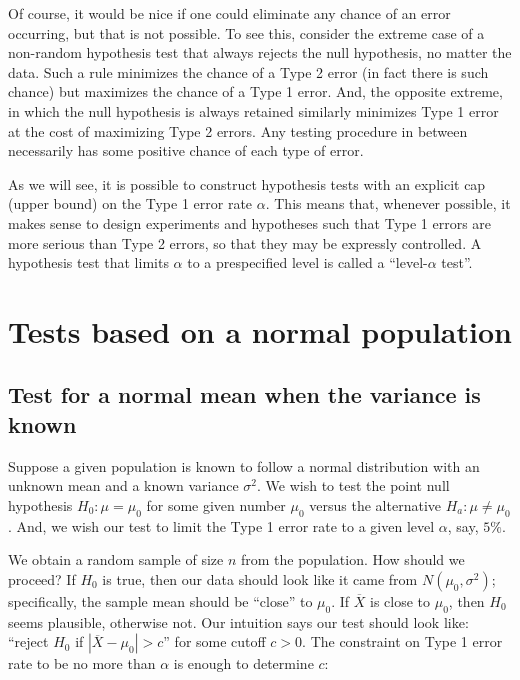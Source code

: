 \documentclass[]{book}
\begin{document}
Of course, it would be nice if one could eliminate any chance of an
error occurring, but that is not possible. To see this, consider the
extreme case of a non-random hypothesis test that always rejects the
null hypothesis, no matter the data. Such a rule minimizes the chance of
a Type 2 error (in fact there is such chance) but maximizes the chance
of a Type 1 error. And, the opposite extreme, in which the null
hypothesis is always retained similarly minimizes Type 1 error at the
cost of maximizing Type 2 errors. Any testing procedure in between
necessarily has some positive chance of each type of error.

As we will see, it is possible to construct hypothesis tests with an
explicit cap (upper bound) on the Type 1 error rate \(\alpha\). This
means that, whenever possible, it makes sense to design experiments and
hypotheses such that Type 1 errors are more serious than Type 2 errors,
so that they may be expressly controlled. A hypothesis test that limits
\(\alpha\) to a prespecified level is called a ``level-\(\alpha\)
test''.

\section{Tests based on a normal
population}\label{tests-based-on-a-normal-population}

\subsection{Test for a normal mean when the variance is
known}\label{test-for-a-normal-mean-when-the-variance-is-known}

Suppose a given population is known to follow a normal distribution with
an unknown mean and a known variance \(\sigma^2\). We wish to test the
point null hypothesis \(H_0:\mu = \mu_0\) for some given number
\(\mu_0\) versus the alternative \(H_a:\mu \ne \mu_0\). And, we wish our
test to limit the Type 1 error rate to a given level \(\alpha\), say,
\(5\%\).

We obtain a random sample of size \(n\) from the population. How should
we proceed? If \(H_0\) is true, then our data should look like it came
from \(N(\mu_0, \sigma^2)\); specifically, the sample mean should be
``close'' to \(\mu_0\). If \(\overline X\) is close to \(\mu_0\), then
\(H_0\) seems plausible, otherwise not. Our intuition says our test
should look like: ``reject \(H_0\) if \(|\overline X-\mu_0|>c\)'' for
some cutoff \(c>0\). The constraint on Type 1 error rate to be no more
than \(\alpha\) is enough to determine \(c\):
\end{document}
